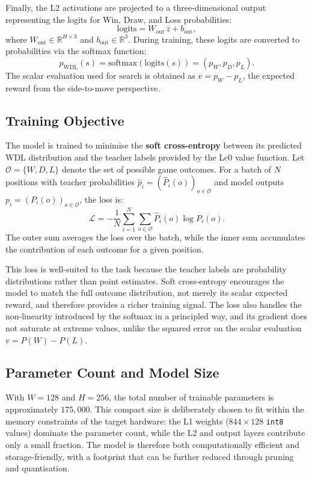 Finally, the L2 activations are projected to a three-dimensional output representing the logits for Win, Draw, and Loss probabilities:
\[
\mathrm{logits} = W_{\mathrm{out}} \, z + b_{\mathrm{out}},
\]
where \(W_{\mathrm{out}} \in \mathbb{R}^{H \times 3}\) and \(b_{\mathrm{out}} \in \mathbb{R}^{3}\). During training, these logits are converted to probabilities via the softmax function:
\[
p_{\mathrm{WDL}}(s) = \mathrm{softmax}(\mathrm{logits}(s)) = (p_W, p_D, p_L).
\]
The scalar evaluation used for search is obtained as \(v = p_W - p_L\), the expected reward from the side-to-move perspective.

\subsection{Training Objective}\label{sec:training-objective}

The model is trained to minimise the \textbf{soft cross-entropy} between its predicted WDL distribution and the teacher labels provided by the Lc0 value function. Let \(\mathcal{O} = \{W, D, L\}\) denote the set of possible game outcomes. For a batch of \(N\) positions with teacher probabilities \(\hat{p}_i = (\hat{P}_i(o))_{o \in \mathcal{O}}\) and model outputs \(p_i = (P_i(o))_{o \in \mathcal{O}}\), the loss is:
\[
\mathcal{L} = -\frac{1}{N} \sum_{i=1}^N \sum_{o \in \mathcal{O}} \hat{P}_i(o) \log P_i(o).
\]
The outer sum averages the loss over the batch, while the inner sum accumulates the contribution of each outcome for a given position.

This loss is well-suited to the task because the teacher labels are probability distributions rather than point estimates. Soft cross-entropy encourages the model to match the full outcome distribution, not merely its scalar expected reward, and therefore provides a richer training signal. The loss also handles the non-linearity introduced by the softmax in a principled way, and its gradient does not saturate at extreme values, unlike the squared error on the scalar evaluation \(v = P(W) - P(L)\).

\subsection{Parameter Count and Model Size}\label{sec:param-count}

With \(W = 128\) and \(H = 256\), the total number of trainable parameters is approximately \(175{,}000\). This compact size is deliberately chosen to fit within the memory constraints of the target hardware: the L1 weights (\(844 \times 128\) \texttt{int8} values) dominate the parameter count, while the L2 and output layers contribute only a small fraction. The model is therefore both computationally efficient and storage-friendly, with a footprint that can be further reduced through pruning and quantisation.

